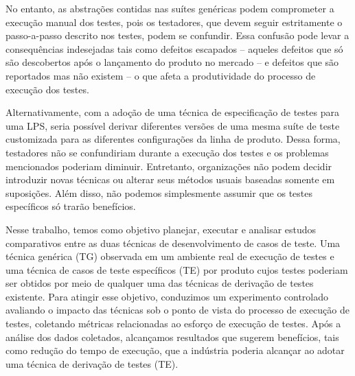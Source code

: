 No entanto, as abstrações contidas nas suítes genéricas podem comprometer a
execução manual dos testes, pois os testadores, que devem seguir estritamente o
passo-a-passo descrito nos testes, podem se confundir. Essa confusão pode levar
a consequências indesejadas tais como defeitos escapados -- aqueles defeitos que
só são descobertos após o lançamento do produto no mercado -- e defeitos que são
reportados mas não existem -- o que afeta a produtividade do processo de
execução dos testes.

Alternativamente, com a adoção de uma técnica de especificação de testes para
uma LPS, seria possível derivar diferentes versões de uma mesma suíte de teste
customizada para as diferentes configurações da linha de produto. Dessa forma,
testadores não se confundiriam durante a execução dos testes e os problemas
mencionados poderiam diminuir. Entretanto, organizações não podem decidir
introduzir novas técnicas ou alterar seus métodos usuais baseadas somente em
suposições. Além disso, não podemos simplesmente assumir que os testes
específicos só trarão benefícios.


Nesse trabalho, temos como objetivo planejar, executar e analisar estudos
comparativos entre as duas técnicas de desenvolvimento de casos de teste. Uma
técnica genérica (TG) observada em um ambiente real de execução de testes e uma
técnica de casos de teste específicos (TE) por produto cujos testes poderiam ser
obtidos por meio de qualquer uma das técnicas de derivação de testes existente.
Para atingir esse objetivo, conduzimos um experimento controlado avaliando o
impacto das técnicas sob o ponto de vista do processo de execução de testes,
coletando métricas relacionadas ao esforço de execução de testes. Após a
análise dos dados coletados, alcançamos resultados que sugerem benefícios, tais
como redução do tempo de execução, que a indústria poderia alcançar ao adotar
uma técnica de derivação de testes (TE).



